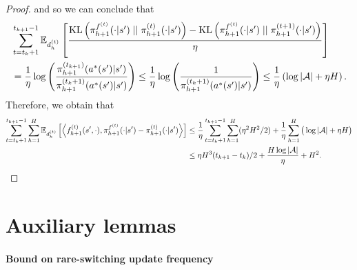 \begin{proof}
and so we can conclude that
\begin{align}
    &\sum_{t=t_k+1}^{t_{k+1}-1} \mathbb{E}_{d_h^{(t)}}\left[ \frac{\text{KL}\left(\pi_{h+1}^{f^{(t)}}(\cdot | s')\; || \;\pi_{h+1}^{(t)}(\cdot | s')\right) - \text{KL}\left(\pi_{h+1}^{f^{(t)}}(\cdot | s')\; || \;\pi_{h+1}^{(t+1)}(\cdot | s')\right)}{\eta} \right]\nonumber\\
    & = \frac{1}{\eta}\log\left(\frac{\pi_{h+1}^{(t_{k+1})} ( a^*(s') | s')}{\pi_{h+1}^{(t_k+1)}(a^*(s') | s')}\right) \leq \frac{1}{\eta}\log\left(\frac{1}{\pi_{h+1}^{(t_k+1)}(a^*(s') | s')}\right) \leq \frac{1}{\eta}\left(\log|{\mathcal{A}}| + \eta H\right).
\end{align}
Therefore, we obtain that
\begin{align}
    \sum_{t=t_k+1}^{t_{k+1}-1} \sum_{h=1}^H \mathbb{E}_{d_h^{(t)}}\left[\left\langle f_{h+1}^{(t)}(s', \cdot), \pi_{h+1}^{f^{(t)}}(\cdot | s') - \pi_{h+1}^{(t)}(\cdot | s')\right\rangle \right] 
  &\leq \frac{1}{\eta} \sum_{t=t_k+1}^{t_{k+1}-1} \sum_{h=1}^H(\eta^2H^2/2) + \frac{1}{\eta}\sum_{h=1}^{H}\big(\log|\mathcal{A}| + \eta H\big) \nonumber\\
    &\leq \eta H^3 (t_{k+1} - t_k)/2 + \frac{H\log|{\mathcal{A}}|}{\eta} + H^2.
\end{align}
\end{proof}

\section{Auxiliary lemmas}

\paragraph{Bound on rare-switching update frequency}

